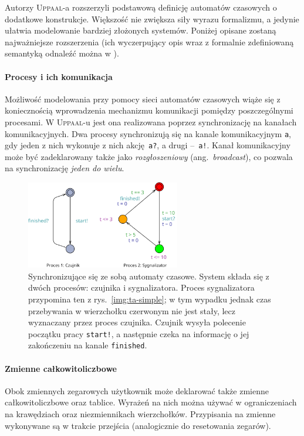 \documentclass{pracamgr}
\newcommand{\ang}[1]{(ang.~\emph{#1})}
\newcommand{\imgr}[1]{rys.~\ref{#1}}
\newcommand{\upp}{\textsc{Uppaal}}
\theoremstyle{plain}
\begin{document}
Autorzy \upp-a rozszerzyli podstawową definicję automatów czasowych o
dodatkowe konstrukcje. Większość nie zwiększa siły
wyrazu formalizmu, a jedynie ułatwia modelowanie bardziej złożonych
systemów.  Poniżej opisane zostaną najważniejsze rozszerzenia
(ich wyczerpujący opis wraz z formalnie zdefiniowaną semantyką
odnaleźć można w \cite{by-lncs04}).
\paragraph{Procesy i ich komunikacja} Możliwość modelowania przy
pomocy sieci automatów czasowych wiąże się z koniecznością
wprowadzenia mechanizmu komunikacji pomiędzy poszczególnymi
procesami. W \upp-u jest ona realizowana poprzez synchronizację na
kanałach komunikacyjnych. Dwa procesy synchronizują się na kanale
komunikacyjnym \texttt{a}, gdy jeden z nich wykonuje z nich
akcję~\texttt{a?}, a drugi --~\texttt{a!}. Kanał komunikacyjny może
być zadeklarowany także jako \emph{rozgłoszeniowy} \ang{broadcast}, co
pozwala na synchronizację \emph{jeden do wielu}.
\begin{figure}
  \includegraphics[width=0.6\textwidth]{img/ta-communication}
  \caption[Synchronizujące się ze sobą automaty czasowe.]
  {Synchronizujące się ze sobą automaty czasowe. System składa się z
    dwóch procesów: czujnika i sygnalizatora. Proces sygnalizatora
    przypomina ten z \imgr{img:ta-simple}; w tym wypadku jednak czas
    przebywania w wierzchołku czerwonym nie jest stały, lecz
    wyznaczany przez proces czujnika. Czujnik wysyła polecenie
    początku pracy \texttt{start!}, a następnie czeka na informację o
    jej zakończeniu na kanale \texttt{finished}.}
\end{figure}

\paragraph{Zmienne całkowitoliczbowe} Obok zmiennych zegarowych
użytkownik może deklarować także zmienne całkowitoliczbowe oraz
tablice. Wyrażeń na nich można używać w ograniczeniach na krawędziach
oraz niezmiennikach wierzchołków. Przypisania na zmienne wykonywane są
w trakcie przejścia (analogicznie do resetowania zegarów).
\end{document}
